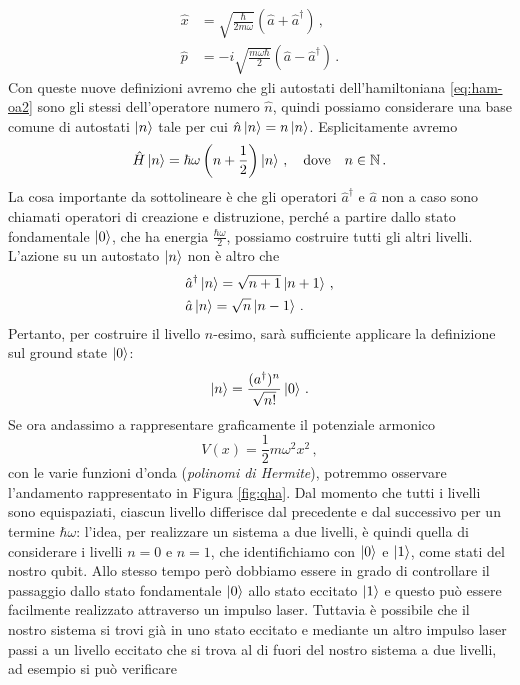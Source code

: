 \begin{align}
    \hat x &= \sqrt{\frac{\hbar}{2m\omega}}\left(\hat a + \hat a^\dagger\right) \, , \label{x_a_adag} \\
    \hat p &= -i\sqrt{\frac{m\omega\hbar}{2}}\left(\hat a - \hat a^\dagger\right) \, .
\end{align}
Con queste nuove definizioni avremo che gli autostati dell'hamiltoniana \eqref{eq:ham-oa2} sono gli stessi dell'operatore numero $\hat n$, quindi possiamo considerare una base comune di autostati $\ket n$ tale per cui $\hat n \ket n = n \ket n$. Esplicitamente avremo
\begin{equation*}
    \hat H \ket n = \hbar \omega \left(n + \frac 12 \right)\ket n \, , \quad \text{dove} \quad n \in \mathbb{N} \, .
\end{equation*}
La cosa importante da sottolineare è che gli operatori $\hat a^\dagger$ e $\hat a$ non a caso sono chiamati operatori di creazione e distruzione, perché a partire dallo stato fondamentale $\ket 0$, che ha energia $\frac{\hbar\omega}{2}$, possiamo costruire tutti gli altri livelli. L'azione su un autostato $\ket n$ non è altro che
\begin{equation}\label{a_adag_action_states}
\begin{aligned}
    &\hat a^\dagger \ket n = \sqrt{n+1}\ket{n+1}\, , \\
    &\hat a \ket n = \sqrt n \ket{n-1} \, .
\end{aligned}
\end{equation}
Pertanto, per costruire il livello $n$-esimo, sarà sufficiente applicare la definizione sul ground state $\ket{0}$:
\begin{equation*}
    \ket n = \frac{(a^\dagger)^n}{\sqrt{n!}}\ket 0 \, .
\end{equation*}
Se ora andassimo a rappresentare graficamente il potenziale armonico
\begin{equation*}
    V(x) = \frac 12 m \omega^2 x^2 \, ,
\end{equation*}
con le varie funzioni d'onda (\textit{polinomi di Hermite}), potremmo osservare l'andamento rappresentato in Figura \ref{fig:qha}. Dal momento che tutti i livelli sono equispaziati, ciascun livello differisce dal precedente e dal successivo per un termine $\hbar\omega$: l'idea, per realizzare un sistema a due livelli, è quindi quella di considerare i livelli $n=0$ e $n=1$, che identifichiamo con $\ket 0$ e $\ket 1$, come stati del nostro qubit. Allo stesso tempo però dobbiamo essere in grado di controllare il passaggio dallo stato fondamentale $\ket 0$ allo stato eccitato $\ket 1$ e questo può essere facilmente realizzato attraverso un impulso laser. Tuttavia è possibile che il nostro sistema si trovi già in uno stato eccitato e mediante un altro impulso laser passi a un livello eccitato che si trova al di fuori del nostro sistema a due livelli, ad esempio si può verificare
